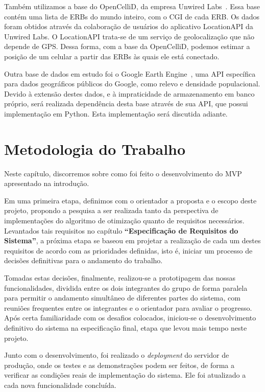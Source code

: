 \documentclass[]{politex}
\begin{document}
Também utilizamos a base do OpenCelliD, da empresa Unwired Labs~\cite{opencellid}.
Essa base contém uma lista de ERBs do mundo inteiro, com o
CGI de cada ERB. Os dados foram obtidos através da colaboração de usuários do
aplicativo LocationAPI da Unwired Labs. O LocationAPI trata-se de um serviço de
geolocalização que não depende de GPS. Dessa forma, com a base da OpenCelliD,
podemos estimar a posição de um celular a partir das ERBs às quais ele está
conectado.

Outra base de dados em estudo foi o Google Earth Engine~\cite{earthengine}, uma
API específica para dados geográficos públicos do Google, como relevo e
densidade populacional. Devido à extensão destes dados, e à impraticidade de
armazenamento em banco próprio, será realizada dependência desta base através
de sua API, que possui implementação em Python. Esta implementação será
discutida adiante.

\chapter{Metodologia do Trabalho}

Neste capítulo, discorremos sobre como foi feito o desenvolvimento do MVP
apresentado na introdução.

Em uma primeira etapa, definimos com o orientador a proposta e o escopo deste
projeto, propondo a pesquisa a ser realizada tanto da perspectiva de
implementações do algoritmo de otimização quanto de requisitos necessários. Levantados tais requisitos no
capítulo \textbf{``Especificação de Requisitos do Sistema''}, a próxima etapa
se baseou em projetar a realização de cada um destes requisitos de acordo com as
prioridades definidas, isto é, iniciar um processo de decisões definitivas para
o andamento do trabalho.

Tomadas estas decisões, finalmente, realizou-se a prototipagem das nossas
funcionalidades, dividida entre os dois integrantes do grupo de forma paralela
para permitir o andamento simultâneo de diferentes partes do sistema, com reuniões
frequentes entre os integrantes e o orientador para avaliar o progresso. Após
certa familiaridade com os desafios colocados, iniciou-se o desenvolvimento definitivo do sistema na
especificação final, etapa que levou mais tempo neste projeto.

Junto com o desenvolvimento, foi realizado o \textit{deployment} do servidor de produção,
onde os testes e as demonstrações podem ser feitos, de forma a verificar as
condições reais de implementação do sistema. Ele foi atualizado a cada nova
funcionalidade concluída.
\end{document}
